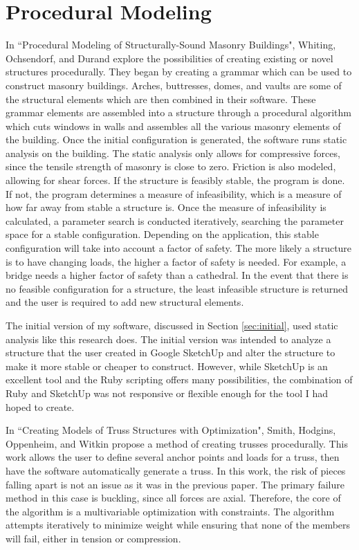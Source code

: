 \documentclass{thesis}
\begin{document}
\section{Procedural Modeling}
In ``Procedural Modeling of Structurally-Sound Masonry Buildings"\cite{whiting:2009}, Whiting, Ochsendorf, and Durand explore
the possibilities of creating existing or novel structures procedurally.  They began by creating a grammar
which can be used to construct masonry buildings.  Arches, buttresses, domes, and vaults are some of the
structural elements which are then combined in their software.  These grammar elements are assembled into
a structure through a procedural algorithm which cuts windows in walls and assembles
all the various masonry elements of the building.  Once the initial configuration is
generated, the software runs static analysis on the building.  The static analysis only allows for compressive
forces, since the tensile strength of masonry is close to zero.  Friction is also modeled, allowing for shear
forces.  If the structure is feasibly stable, the program is done.  If not, the program determines a measure
of infeasibility, which is a measure of how far away from stable a structure is.  Once the measure
of infeasibility is calculated, a parameter search is conducted iteratively, searching the parameter space
for a stable configuration.  Depending on the application, this stable configuration will take into account
a factor of safety.  The more likely a structure is to have changing loads, the higher a factor of
safety is needed.  For example, a bridge needs a higher factor of safety than a cathedral.  In the event
that there is no feasible configuration for a structure, the least infeasible structure is returned and the
user is required to add new structural elements.

The initial version of my software, discussed in Section \ref{sec:initial}, used static analysis like this
research does.  The initial version was intended to analyze a structure that the user created in Google
SketchUp\cite{sketchup} and alter the structure to make it more stable or cheaper to construct.  However,
while SketchUp is an excellent tool and the Ruby scripting offers many possibilities, the combination of
Ruby and SketchUp was not responsive or flexible enough for the tool I had hoped to create.

In ``Creating Models of Truss Structures with Optimization"\cite{Carnegie02creatingmodels}, Smith, Hodgins,
Oppenheim, and Witkin propose a method of creating trusses procedurally.  This work allows the user to define
several anchor points and loads for a truss, then have the software automatically generate a truss.  In this
work, the risk of pieces falling apart is not an issue as it was in the previous paper.  The primary failure
method in this case is buckling, since all forces are axial.  Therefore, the core of the algorithm is a
multivariable optimization with constraints.  The algorithm attempts iteratively to minimize weight
while ensuring that none of the members will fail, either in tension or compression.
\end{document}
